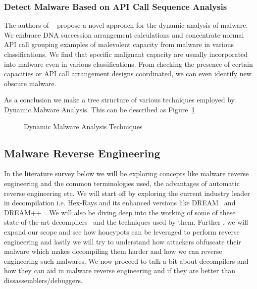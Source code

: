 \documentclass[11pt]{article}
\begin{document}
		\subsubsection{Detect Malware Based on API Call Sequence Analysis}
		The authors of ~\cite{ki2015novel} propose a novel approach for the dynamic analysis of malware. We embrace DNA succession arrangement calculations and concentrate normal API call grouping examples of malevolent capacity from malware in various classifications. We find that specific malignant capacity are usually incorporated into malware even in various classifications. From checking the presence of certain capacities or API call arrangement designs coordinated, we can even identify new obscure malware.
		
		As a conclusion we make a tree structure of various techniques employed by Dynamic Malware Analysis. This can be described as Figure~\ref{Dynamic}
		\begin{figure}
			\centering
			\caption{Dynamic Malware Analysis Techniques}\label{Dynamic}
		\end{figure}

	\subsection{Malware Reverse Engineering}
	In the literature survey below we will be exploring concepts like malware reverse engineering and the common terminologies used, the advantages of automatic reverse engineering etc. We will start off by exploring the current industry leader in decompilation i.e. Hex-Rays and its enhanced versions like DREAM~\cite{yakdan2015no} and DREAM++~\cite{yakdan2016helping}. We will also be diving deep into the working of some of these state-of-the-art decompilers~\cite{guilfanov2008decompilers} and the techniques used by them. Further , we will expand our scope and see how honeypots can be leveraged to perform reverse engineering and lastly we will try to understand how attackers obfuscate their malware which makes decompiling them harder and how we can reverse engineering such malwares. We now proceed to talk a bit about decompilers and how they can aid in malware reverse engineering and if they are better than dissassemblers/debuggers.\\ \\
	
\end{document}
